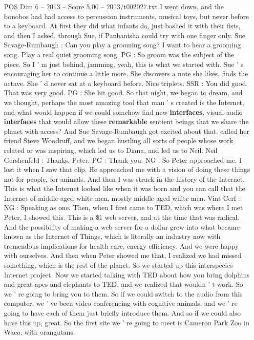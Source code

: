 \begin{textsample}{POS Dim 6 – 2013 – Score 5.00 – 2013/t002027.txt}
I went down, and the bonobos had had access to percussion instruments, musical toys, but never before to a keyboard.
At first they did what infants do, just bashed it with their fists, and then I asked, through Sue, if Panbanisha could try with one finger only.
Sue Savage-Rumbaugh : Can you play a grooming song?
I want to hear a grooming song.
Play a real quiet grooming song.
PG : So groom was the subject of the piece.
So I ' m just behind, jamming, yeah, this is what we started with.
Sue ' s encouraging her to continue a little more.
She discovers a note she likes, finds the octave.
She ' d never sat at a keyboard before.
Nice triplets.
SSR : You did good.
That was very good.
PG : She hit good.
So that night, we began to dream, and we thought, perhaps the most amazing tool that man ' s created is the Internet, and what would happen if we could somehow find new \textbf{interfaces}, visual-audio \textbf{interfaces} that would allow these \textbf{remarkable} sentient beings that we share the planet with access?
And Sue Savage-Rumbaugh got excited about that, called her friend Steve Woodruff, and we began hustling all sorts of people whose work related or was inspiring, which led us to Diana, and led us to Neil.
Neil Gershenfeld : Thanks, Peter.
PG : Thank you.
NG : So Peter approached me.
I lost it when I saw that clip.
He approached me with a vision of doing these things not for people, for animals.
And then I was struck in the history of the Internet.
This is what the Internet looked like when it was born and you can call that the Internet of middle-aged white men, mostly middle-aged white men.
Vint Cerf : NG : Speaking as one.
Then, when I first came to TED, which was where I met Peter, I showed this.
This is a \$1 web server, and at the time that was radical.
And the possibility of making a web server for a dollar grew into what became known as the Internet of Things, which is literally an industry now with tremendous implications for health care, energy efficiency.
And we were happy with ourselves.
And then when Peter showed me that, I realized we had missed something, which is the rest of the planet.
So we started up this interspecies Internet project.
Now we started talking with TED about how you bring dolphins and great apes and elephants to TED, and we realized that wouldn ' t work.
So we ' re going to bring you to them.
So if we could switch to the audio from this computer, we ' ve been video conferencing with cognitive animals, and we ' re going to have each of them just briefly introduce them.
And so if we could also have this up, great.
So the first site we ' re going to meet is Cameron Park Zoo in Waco, with orangutans.

\end{textsample}
